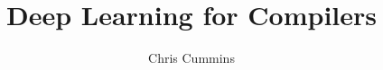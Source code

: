 

\title{Deep Learning for Compilers}
\author{Chris Cummins}

\abstract{}


  \begin{preliminary}
    \maketitle
    \begin{acknowledgements}\end{acknowledgements}
    \begin{declaration}\end{declaration}
    \tableofcontents
    \listoffigures
    \listoftables
    \listoflistings
  \end{preliminary}
  
  
  
  
  
  
  
  

